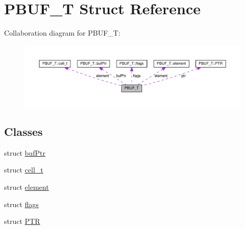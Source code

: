 \hypertarget{structPBUF__T}{}\section{P\+B\+U\+F\+\_\+T Struct Reference}
\label{structPBUF__T}


Collaboration diagram for P\+B\+U\+F\+\_\+T\+:\nopagebreak
\begin{figure}[H]
\begin{center}
\leavevmode
\includegraphics[width=350pt]{structPBUF__T__coll__graph}
\end{center}
\end{figure}
\subsection*{Classes}
\begin{DoxyCompactItemize}
\item 
struct \hyperlink{structPBUF__T_1_1bufPtr}{buf\+Ptr}
\item 
struct \hyperlink{structPBUF__T_1_1cell__t}{cell\+\_\+t}
\item 
struct \hyperlink{structPBUF__T_1_1element}{element}
\item 
struct \hyperlink{structPBUF__T_1_1flags}{flags}
\item 
struct \hyperlink{structPBUF__T_1_1PTR}{P\+TR}
\end{DoxyCompactItemize}
